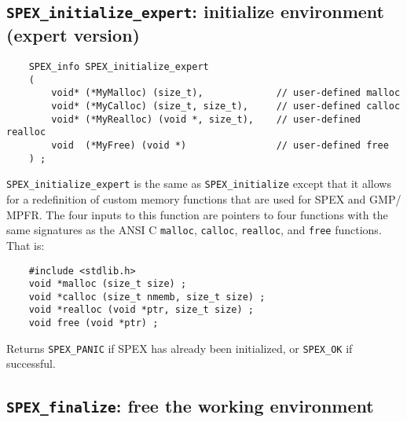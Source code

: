 \documentclass[12pt]{report}
\theoremstyle{definition}
\begin{document}
\cprotect\subsection{\verb|SPEX_initialize_expert|: initialize environment
(expert version)}\label{ss:SPEX_initialize_expert}

\begin{mdframed}[userdefinedwidth=6in]
{\footnotesize
\begin{verbatim}
    SPEX_info SPEX_initialize_expert
    (
        void* (*MyMalloc) (size_t),             // user-defined malloc
        void* (*MyCalloc) (size_t, size_t),     // user-defined calloc
        void* (*MyRealloc) (void *, size_t),    // user-defined realloc
        void  (*MyFree) (void *)                // user-defined free
    ) ;
\end{verbatim}
} \end{mdframed}

\verb|SPEX_initialize_expert| is the same as \verb|SPEX_initialize| except that
it allows for a redefinition of custom memory functions that are used for SPEX
and GMP/ MPFR.  The four inputs to this function are pointers to four
functions with the same signatures as the ANSI C \verb'malloc', \verb'calloc',
\verb'realloc', and \verb'free' functions.  That is:

\begin{mdframed}[userdefinedwidth=6in]
{\footnotesize
\begin{verbatim}
    #include <stdlib.h>
    void *malloc (size_t size) ;
    void *calloc (size_t nmemb, size_t size) ;
    void *realloc (void *ptr, size_t size) ;
    void free (void *ptr) ;
\end{verbatim}
} \end{mdframed}

Returns \verb|SPEX_PANIC| if SPEX has already been initialized,
or \verb|SPEX_OK| if successful.

\newpage
\cprotect\subsection{\verb|SPEX_finalize|: free the working environment}
\label{ss:SPEX_finalize}
\end{document}
